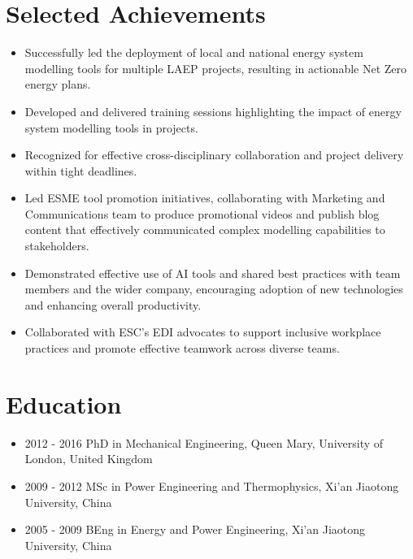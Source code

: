 \documentclass[letterpaper]{article}
\begin{document}
\section*{Selected Achievements}
\begin{itemize}
\item Successfully led the deployment of local and national energy system modelling tools for multiple LAEP projects, resulting in actionable Net Zero energy plans.
\item Developed and delivered training sessions highlighting the impact of energy system modelling tools in projects.
\item Recognized for effective cross-disciplinary collaboration and project delivery within tight deadlines.
\item Led ESME tool promotion initiatives, collaborating with Marketing and Communications team to produce promotional videos and publish blog content that effectively communicated complex modelling capabilities to stakeholders.
\item Demonstrated effective use of AI tools and shared best practices with team members and the wider company, encouraging adoption of new technologies and enhancing overall productivity.
\item Collaborated with ESC's EDI advocates to support inclusive workplace practices and promote effective teamwork across diverse teams.
\end{itemize}

\section*{Education}
\begin{itemize}
  \item 2012 - 2016 \hspace{2pt} PhD in Mechanical Engineering, Queen Mary, University of London, United Kingdom
  \item 2009 - 2012 \hspace{2pt} MSc in Power Engineering and Thermophysics, Xi’an Jiaotong University, China
  \item 2005 - 2009 \hspace{2pt} BEng in Energy and Power Engineering, Xi’an Jiaotong University, China
\end{itemize}
\end{document}
